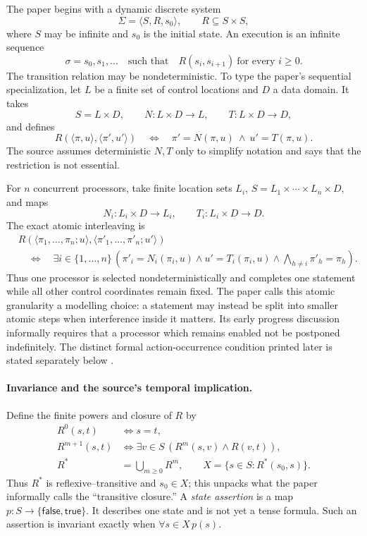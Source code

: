 The paper begins with a dynamic discrete system
\[
 \Sigma=\langle S,R,s_0\rangle,
 \qquad R\subseteq S\times S,
\]
where \(S\) may be infinite and \(s_0\) is the initial state.  An execution is
an infinite sequence
\[
 \sigma=s_0,s_1,\ldots
 \quad\text{such that}\quad
 R(s_i,s_{i+1})\ \text{for every }i\ge 0.
\]
The transition relation may be nondeterministic.  To type the paper's
sequential specialization, let \(L\) be a finite set of control locations and
\(D\) a data domain.  It takes
\[
 S=L\times D,
 \qquad
 N:L\times D\to L,
 \qquad
 T:L\times D\to D,
\]
and defines
\[
 R(\langle\pi,u\rangle,\langle\pi',u'\rangle)
 \quad\Longleftrightarrow\quad
 \pi'=N(\pi,u)\ \land\ u'=T(\pi,u).
\]
The source assumes deterministic \(N,T\) only to simplify notation and says
that the restriction is not essential.

For \(n\) concurrent processors, take finite location sets \(L_i\),
\(S=L_1\times\cdots\times L_n\times D\), and maps
\[
 N_i:L_i\times D\to L_i,
 \qquad
 T_i:L_i\times D\to D.
\]
The exact atomic interleaving is
\[
\begin{split}
&R(\langle\pi_1,\ldots,\pi_n;u\rangle,
   \langle\pi'_1,\ldots,\pi'_n;u'\rangle)\\
&\quad\Longleftrightarrow\quad
 \exists i\in\{1,\ldots,n\}\,
 \left(
   \pi'_i=N_i(\pi_i,u)\land
   u'=T_i(\pi_i,u)\land
   \bigwedge_{h\ne i}\pi'_h=\pi_h
 \right).
\end{split}
\]
Thus one processor is selected nondeterministically and completes one
statement while all other control coordinates remain fixed.  The paper calls
this atomic granularity a modelling choice: a statement may instead be split
into smaller atomic steps when interference inside it matters.  Its early
progress discussion informally requires that a processor which remains enabled
not be postponed indefinitely.  The distinct formal action-occurrence condition
printed later is stated separately below
\cite[pp.~46--47]{Pnueli1977}.

\paragraph{Invariance and the source's temporal implication.}
Define the finite powers and closure of \(R\) by
\[
\begin{aligned}
 R^0(s,t)&\Longleftrightarrow s=t,\\
 R^{m+1}(s,t)&\Longleftrightarrow
   \exists v\in S\,(R^m(s,v)\land R(v,t)),\\
 R^*&=\bigcup_{m\ge0}R^m,
 \qquad
 X=\{s\in S:R^*(s_0,s)\}.
\end{aligned}
\]
Thus \(R^*\) is reflexive--transitive and \(s_0\in X\); this unpacks what the
paper informally calls the ``transitive closure.''  A \emph{state assertion}
is a map
\(p:S\to\{\mathsf{false},\mathsf{true}\}\).  It describes one state and is
not yet a tense formula.  Such an assertion is invariant exactly when
\(\forall s\in X\,p(s)\).


